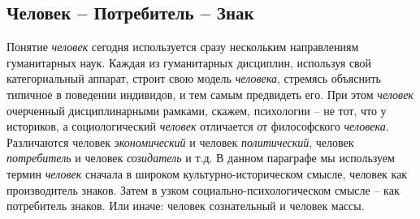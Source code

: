 \subsection{Человек -- Потребитель -- Знак}

Понятие \emph{человек} сегодня используется сразу нескольким
направлениям гуманитарных наук. Каждая из гуманитарных дисциплин,
используя свой категориальный аппарат, строит свою модель \emph{человека},
стремясь объяснить типичное в поведении индивидов, и тем самым
предвидеть его. При этом \emph{человек} очерченный дисциплинарными
рамками, скажем, психологии -- не тот, что у историков, а социологический
\emph{человек} отличается от философского \emph{человека}. Различаются человек
\emph{экономический} и человек \emph{политический}, человек \emph{потребитель} и
человек \emph{созидатель} и т.д. В данном параграфе мы используем термин
\emph{человек} сначала в широком культурно-историческом смысле, человек как
производитель знаков. Затем в узком социально-психологическом смысле --
как потребитель знаков. Или иначе: человек сознательный и человек массы.

